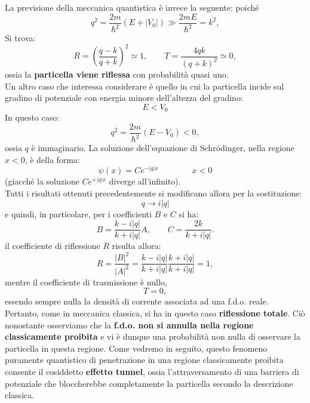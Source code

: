 \documentclass[a4paper,12pt,twoside]{book}
\begin{document}
La previsione della meccanica quantistica è invece la seguente: poiché
\begin{equation}
q^2=\frac{2m}{\hbar ^2}\left( E+ |V_0| \right) \gg \frac{2mE}{\hbar ^2} = k^2,
\end{equation}
Si trova:
\begin{equation}
R=\left( \frac{q-k}{q+k} \right) ^2 \simeq 1, \qquad T=\frac{4qk}{\left( q+k \right) ^2} \simeq 0,
\end{equation}
ossia la \textbf{particella viene riflessa} con probabilità quasi uno.\\
Un altro caso che interessa considerare è quello in cui la particella incide sul gradino di potenziale con energia minore dell'altezza del gradino:
\[E<V_0\]
In questo caso:
\begin{equation}
q^2=\frac{2m}{\hbar ^2}\left( E- V_0 \right)<0,
\end{equation}
ossia $q$ è immaginario. La soluzione dell'equazione di Schr\"{o}dinger, nella regione $x<0$, è della forma:
\begin{equation}
\psi (x) = Ce^{-|q|x} \qquad \qquad x<0
\end{equation}
(giacché la soluzione $\displaystyle{Ce^{+|q|x}}$ diverge all'infinito).\\
Tutti i risultati ottenuti precedentemente si modificano allora per la sostituzione:
\begin{equation}
q \rightarrow i|q|
\end{equation}
e quindi, in particolare, per i coefficienti $B$ e $C$ si ha:
\begin{equation}
B=\frac{k-i|q|}{k+i|q|}A, \qquad C=\frac{2k}{k+i|q|}.
\end{equation}
il coefficiente di riflessione $R$ risulta allora:
\begin{equation}
R=\frac{|B|^2}{|A|^2}=\frac{k-i|q|}{k+i|q|}\frac{k+i|q|}{k+i|q|}=1,
\end{equation}
mentre il coefficiente di trasmissione è nullo,
\begin{equation}
T=0,
\end{equation}
essendo sempre nulla la densità di corrente associata ad una f.d.o. reale.\\
Pertanto, come in meccanica classica, si ha in questo caso \textbf{riflessione totale}. Ciò nonostante osserviamo che la \textbf{f.d.o. non si annulla nella regione classicamente proibita} e vi è dunque una probabilità non nulla di osservare la particella in questa regione. Come vedremo in seguito, questo fenomeno puramente quantistico di penetrazione in una regione classicamente proibita consente il cosiddetto \textbf{effetto tunnel}, ossia l'attraversamento di una barriera di potenziale che bloccherebbe completamente la particella secondo la descrizione classica.
\end{document}
